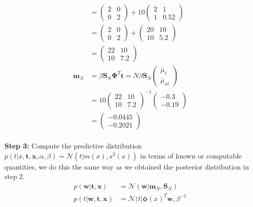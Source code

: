 \documentclass[a4paper,10pt]{article}
\numberwithin{equation}{section} %
\numberwithin{figure}{section} %
\numberwithin{table}{section} %
\theoremstyle{mytheor}
\begin{document}
\begin{enumerate}
\begin{align}
		&= \begin{pmatrix} 2 & 0 \\ 0 & 2 \end{pmatrix} + 10 \begin{pmatrix} 2 & 1 \\ 1 & 0.52 \end{pmatrix}\\
		&=  \begin{pmatrix} 2 & 0 \\ 0 & 2 \end{pmatrix} + \begin{pmatrix} 20 & 10 \\ 10 & 5.2 \end{pmatrix} \\
		&=  \begin{pmatrix} 22 & 10 \\ 10 & 7.2 \end{pmatrix}\\
		\boldsymbol{m}_N &= \beta \boldsymbol{S}_N \boldsymbol{\Phi}^T\boldsymbol{t} = N\beta \boldsymbol{S}_N \begin{pmatrix} \bar{\mu}_t \\ \bar{\mu}_{xt} \end{pmatrix}\\
		&= 10 \begin{pmatrix} 22 & 10 \\ 10 & 7.2 \end{pmatrix}^{-1} \begin{pmatrix} -0.3 \\  -0.19 \end{pmatrix} \\
		&= \begin{pmatrix} -0.0445 \\  -0.2021 \end{pmatrix}
		\end{align}\\
		\textbf{Step 3:} Compute the predictive distribution $p(t | x,\boldsymbol{t},\boldsymbol{x}, \alpha, \beta) = \mathcal{N}(t | m(x), s^2(x))$ in terms of known or computable quantities, we do this the same way as we obtained the posterior distribution in step 2.
		\begin{align}
		p(\boldsymbol{w} | \boldsymbol{t},\boldsymbol{x}) &= \mathcal{N}(\boldsymbol{w}|\boldsymbol{m}_N, \boldsymbol{S}_N)\\
		p(t | \boldsymbol{w}, \boldsymbol{t}, \boldsymbol{x}) &= \mathcal{N}(t | \boldsymbol{\phi}(x)^T\boldsymbol{w}, \beta^{-1}\\

\end{align}
\end{enumerate}
\end{document}
